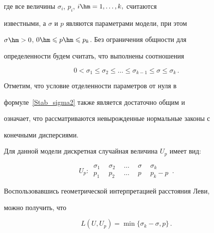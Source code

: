 где все величины $\sigma_i$, $p_i$, $i\hm=1,\ldots , k,$ считаются

известными, а $\sigma$ и $p$ являются параметрами модели, при этом

$\sigma\hm>0$, $0\hm\leqslant p\hm\leqslant p_k$. Без ограничения общности для

определенности будем считать, что выполнены соотношения

\begin{equation}

\label{Stab_sigma2}

0<\sigma_1\leqslant\sigma_2\leqslant\ldots\leqslant\sigma_{k-1}\leqslant\sigma\leqslant\sigma_k\,.

\end{equation}



Отметим, что условие отделенности параметров от нуля в

формуле~\eqref{Stab_sigma2} также является достаточно общим и

означает, что рассматриваются невырожденные нормальные законы с

конечными дисперсиями.



Для данной модели дискретная случайная величина $U_p$ имеет вид:

\begin{equation}

\label{Stab_U_p2} 

U_p:\

\begin{array}{ccccc}

\sigma_1\ \ &\sigma_2\ \ &\ldots\ \ &\sigma\ \ &\sigma_k\\[9pt]

p_1\ \ &p_2\ \ &\ldots\ \ &p\ \ &p_k-p

\end{array}\,.

\end{equation}



Воспользовавшись геометрической интерпретацией расстояния Леви,

можно получить, что

\begin{equation}

\label{Stab_L2} 

L(U,U_p)=\min\{\sigma_k-\sigma,p\}\,.

\end{equation}



